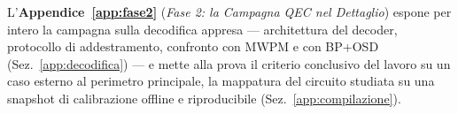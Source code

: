 \begin{onehalfspace}
L'\textbf{Appendice~\ref{app:fase2}} (\textit{Fase 2: la Campagna QEC nel Dettaglio}) espone per intero la campagna sulla decodifica appresa --- architettura del decoder, protocollo di addestramento, confronto con \ac{MWPM} e con BP+OSD (Sez.~\ref{app:decodifica}) --- e mette alla prova il criterio conclusivo del lavoro su un caso esterno al perimetro principale, la mappatura del circuito studiata su una snapshot di calibrazione offline e riproducibile (Sez.~\ref{app:compilazione}).

\end{onehalfspace}
